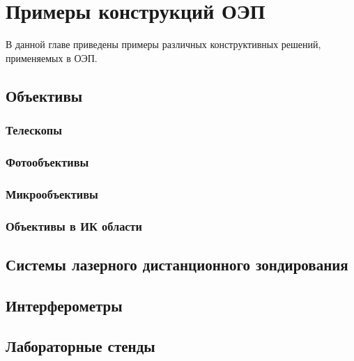 \chapter{Примеры конструкций ОЭП}
В данной главе приведены примеры различных конструктивных решений, применяемых в ОЭП.

\section{Объективы}

\subsection{Телескопы}

\subsection{Фотообъективы}

\subsection{Микрообъективы}

\subsection{Объективы в ИК области}

\section{Системы лазерного дистанционного зондирования}

\section{Интерферометры}

\section{Лабораторные стенды}

